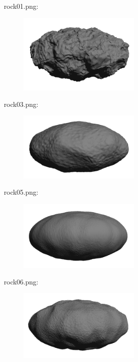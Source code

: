 rock01.png:\\
\begin{center}
\begin{figure}[H]
\centering\includegraphics[width=6cm]{./rock01.png}\\
\end{figure}
\end{center}

rock03.png:\\
\begin{center}
\begin{figure}[H]
\centering\includegraphics[width=6cm]{./rock03.png}\\
\end{figure}
\end{center}

rock05.png:\\
\begin{center}
\begin{figure}[H]
\centering\includegraphics[width=6cm]{./rock05.png}\\
\end{figure}
\end{center}

rock06.png:\\
\begin{center}
\begin{figure}[H]
\centering\includegraphics[width=6cm]{./rock06.png}\\
\end{figure}
\end{center}

